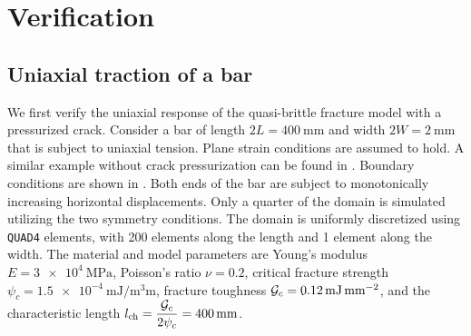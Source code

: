 \section{Verification}
\label{section: Chapter3/verification}

\subsection{Uniaxial traction of a bar}
\label{section: Chapter3/verification/bar}

We first verify the uniaxial response of the quasi-brittle fracture model with a pressurized crack. Consider a bar of length $2L = \SI{400}{\milli\meter}$ and width $2W = \SI{2}{\milli\meter}$ that is subject to uniaxial tension. Plane strain conditions are assumed to hold. A similar example without crack pressurization can be found in \cite{JYWu2017}. Boundary conditions are shown in . Both ends of the bar are subject to monotonically increasing horizontal displacements. Only a quarter of the domain is simulated utilizing the two symmetry conditions. The domain is uniformly discretized using \texttt{QUAD4} elements, with 200 elements along the length and 1 element along the width.
The material and model parameters are Young's modulus $E = \SI{3e4}{\mega\pascal}$, Poisson's ratio $\nu = 0.2$, critical fracture strength $\psi_c = \SI{1.5e-4}{\milli\joule\per\cubic\milli\meter}$, fracture toughness ${\mathcal{G}_c} = \SI{0.12}{\milli\joule\per\square\milli\meter}$, and the characteristic length $l_\text{ch} = \dfrac{{\mathcal{G}_c}}{2\psi_c} = \SI{400}{\milli\meter}$.

